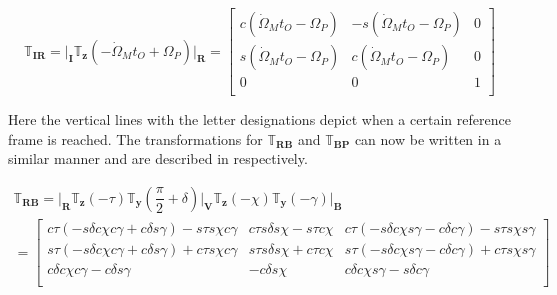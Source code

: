 \begin{equation} \label{eq:IRtrans}
\mathbb{T}_{\mathbf{IR}}=\Bigg|_{\mathbf{I}}\mathbb{T}_{\mathbf{z}}\left(-\dot{\Omega}_{M}t_{O}+\Omega_{P}\right)\Bigg|_{\mathbf{R}}=
\begin{bmatrix}
c\left(\dot{\Omega}_{M}t_{O}-\Omega_{P}\right) & -s\left(\dot{\Omega}_{M}t_{O}-\Omega_{P}\right) & 0\\
s\left(\dot{\Omega}_{M}t_{O}-\Omega_{P}\right) & c\left(\dot{\Omega}_{M}t_{O}-\Omega_{P}\right) & 0\\
0& 0& 1\\
\end{bmatrix}
\end{equation}

Here the vertical lines with the letter designations depict when a certain reference frame is reached. The transformations for $\mathbb{T}_{\mathbf{RB}}$ and $\mathbb{T}_{\mathbf{BP}}$ can now be written in a similar manner and are described in  respectively.

\begin{multline} \label{eq:RBtrans}
\mathbb{T}_{\mathbf{RB}}=\Bigg|_{\mathbf{R}}\mathbb{T}_{\mathbf{z}}\left(-\tau\right)\mathbb{T}_{\mathbf{y}}\left(\dfrac{\pi}{2}+\delta\right)\Bigg|_{\mathbf{V}}\mathbb{T}_{\mathbf{z}}\left(-\chi\right)\mathbb{T}_{\mathbf{y}}\left(-\gamma\right)\Bigg|_{\mathbf{B}}\\
=
\begin{bmatrix}
c\tau\left(-s\delta c\chi c\gamma +c\delta s\gamma \right)-s\tau s\chi c\gamma  & c\tau s\delta s\chi -s\tau c\chi & c\tau\left(-s\delta c\chi s\gamma -c\delta c\gamma \right)-s\tau s\chi s\gamma \\
s\tau\left(-s\delta c\chi c\gamma +c\delta s\gamma \right)+c\tau s\chi c\gamma  & s\tau s\delta s\chi +c\tau c\chi & s\tau\left(-s\delta c\chi s\gamma -c\delta c\gamma \right)+c\tau s\chi s\gamma \\
c\delta c\chi c\gamma -c\delta s\gamma  & -c\delta s\chi &  c\delta c\chi s\gamma -s\delta c\gamma \\
\end{bmatrix}
\end{multline}

